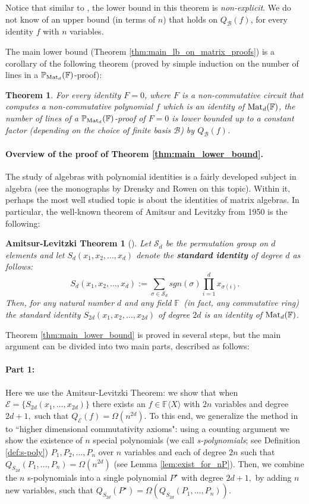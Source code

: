\documentclass[12pt,reqno]{article}
\newtheorem*{theorem*}{Theorem}
\newtheorem*{A-LThm}{Amitsur-Levitzki Theorem}
\renewcommand{\dot}[1]{{#1}^\star}
\newcommand\F{\ensuremath{\mathbb F}}
\newcommand\PP{{\mathbb P}}
\newcommand\PMd{\ensuremath{\PP_{{\rm Mat}_d}(\F)}}
\newcommand {\para}[1] {\paragraph{#1}}
\newcommand{\matd}{{\ensuremath{{\rm Mat}_d(\F)}}}
\newcommand{\freea}{\ensuremath{\F\langle X\rangle}}
\newcommand{\nx}[1]{#1_1,\ldots,#1_{n}}
\renewcommand{\S}{\mathcal{S}}
\begin{document}
Notice that similar to \cite{Hru11}, the lower bound in this theorem is \emph{non-explicit}.
We  do not know of an upper bound (in terms of $n$) that holds on  $Q_{\mathcal B}(f)$, for every identity  $f$ with \(n\) variables.

The main lower bound (Theorem \ref{thm:main_lb_on_matrix_proofs})  is  a corollary of the following theorem (proved by simple induction on the number of lines in a \PMd-proof):
\begin{theorem*}\label{prop:Pmatd-connection}
For every identity $F=0$, where $F$
is a non-commutative circuit that computes a non-commutative polynomial $f$ which is an identity of \matd, the number of lines of a \PMd-proof of $F=0$ is lower bounded up to a constant factor (depending on the choice of finite basis \(\mathcal B\)) by $Q_{\mathcal B}(f)$.
\end{theorem*}




\para{Overview of the proof of Theorem \ref{thm:main_lower_bound}.}

The study of algebras with polynomial identities is a fairly developed subject in algebra (see the monographs by Drensky \cite{Dre99} and Rowen \cite{Row80} on this topic). Within it, perhaps the most well studied topic is about  the identities of matrix algebras. In particular, the well-known theorem of Amitsur and Levitzky from 1950 \cite{AL50} is the following:

\begin{A-LThm}[\cite{AL50}]
Let $\mathcal S_d$ be the permutation group on $d$ elements and let $S_d(x_1,x_2,\ldots, x_{d})$ denote the \textbf{standard identity} of degree $d$ as follows:
$$S_{d}(x_1,x_2,\ldots, x_{d}):=
        \sum_{\sigma\in \S_{d}}sgn(\sigma)\prod_{i=1}^{d}x_{\sigma(i)}.$$
Then, for any  natural number $d$ and any field \F\ (in fact, any commutative ring) the standard identity  $S_{2d}(x_1,x_2,\ldots, x_{2d})$ of degree $2d$ is an identity of  \matd.
\end{A-LThm}


Theorem \ref{thm:main_lower_bound} is proved in several steps, but the main argument can be divided into two main parts, described as follows: \smallskip\



\para{Part 1:} Here we use the Amitsur-Levitzki Theorem: we show that when $\mathcal  E =\{S_{2d}(x_1,\ldots,x_{2d})\}$  there exists an $f\in\freea$ with $2n$ variables and degree $2d+1,$ such that $Q_\mathcal E(f)=\Omega(n^{2d})$.
To this end, we generalize the method in  \cite{Hru11} to ``higher dimensional commutativity axioms": using a counting argument we show the existence of $n$ special polynomials (we call \textit{s-polynomials}; see Definition \ref{def:s-poly}) $P_1,P_2,\ldots,P_n$ over  $n$ variables and each of degree $2n$ such that $Q_{S_{2d}}(\nx{P})=\Omega(n^{2d})$ (see Lemma \ref{lem:exist_for_nP}). Then, we combine the $n$ s-polynomials into a single polynomial $\dot{P}$ with degree $2d+1,$ by adding $n$ new variables, such that $Q_{S_{2d}}(\dot{P})=\Omega(Q_{S_{2d}}(\nx{P}))$.
\end{document}
